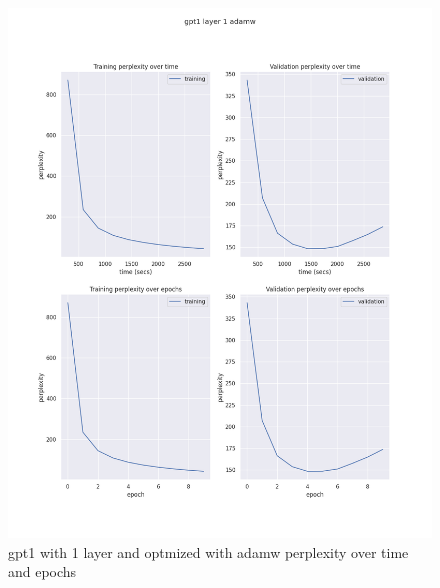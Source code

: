 \documentclass[12pt]{article}
\theoremstyle{definition}
\begin{document}
\begin{figure}[H]
     \centering
     \includegraphics[scale=0.4]{gpt1_layer_1_adamw.png}
     \caption{gpt1 with 1 layer and optmized with adamw perplexity over time and epochs}
\end{figure}
\end{document}
